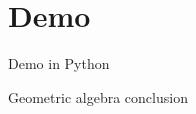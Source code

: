 \section{Demo}

\begin{frame}{Demo in Python}
    \hfill\href{https://tbuli.github.io/teahouse/lab/index.html}{}
\end{frame}


\begin{frame}{Geometric algebra}
    conclusion
\end{frame}






